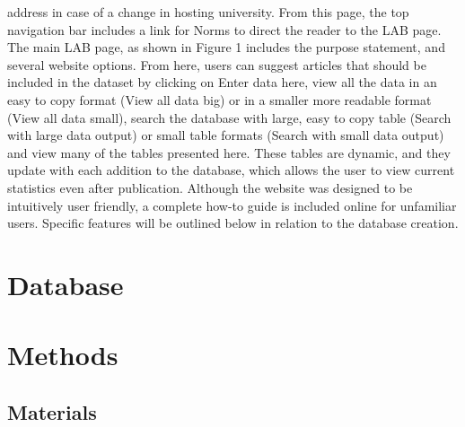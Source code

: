 \documentclass[english,man]{apa6}
\theoremstyle{definition}
\theoremstyle{definition}
\theoremstyle{definition}
\theoremstyle{remark}
\begin{document}
address in case of a change in hosting university. From this page, the
top navigation bar includes a link for Norms to direct the reader to the
LAB page. The main LAB page, as shown in Figure 1 includes the purpose
statement, and several website options. From here, users can suggest
articles that should be included in the dataset by clicking on Enter
data here, view all the data in an easy to copy format (View all data
big) or in a smaller more readable format (View all data small), search
the database with large, easy to copy table (Search with large data
output) or small table formats (Search with small data output) and view
many of the tables presented here. These tables are dynamic, and they
update with each addition to the database, which allows the user to view
current statistics even after publication. Although the website was
designed to be intuitively user friendly, a complete how-to guide is
included online for unfamiliar users. Specific features will be outlined
below in relation to the database creation.

\section{Database}\label{database}

\section{Methods}\label{methods}

\subsection{Materials}\label{materials}
\end{document}
